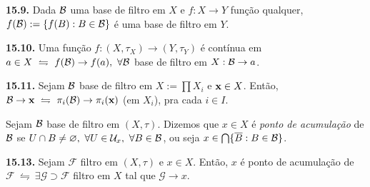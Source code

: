 
\begin{proposition}
    \textbf{15.9.} Dada \(\mathcal{B}\) uma base de filtro em \(X\) e \(f: X \to Y\) função qualquer, \(f(\mathcal{B}):= \{f(B) : B \in \mathcal{B}\}\) é uma base de filtro em \(Y\).  
\end{proposition}

\hypertarget{prop1510}{}
\begin{proposition}
    \textbf{15.10.} Uma função \(f : (X, \tau_X) \to (Y, \tau_Y)\) é contínua em \(a \in X \ \leftrightharpoons \ f(\B) \to f(a), \ \forall \B\) base de filtro em \(X : \mathcal{B} \to a\). 
\end{proposition}

\begin{proposition}
    \textbf{15.11.} Sejam \(\mathcal{B}\) base de filtro em \(X := \prod X_i\) e \(\textbf{x} \in X\). Então, \(\mathcal{B} \to \textbf{x} \ \leftrightharpoons \ \pi_i(\mathcal{B}) \to \pi_i(\textbf{x})\) (em \(X_i\)), pra cada \(i\in I\).
\end{proposition}


\begin{definition}
    Sejam \(\mathcal{B}\) base de filtro em \((X,\tau)\). Dizemos que \(x \in X\) é \emph{ponto de acumulação} de \(\mathcal{B}\) se \(U \cap B \neq \varnothing, \ \forall U \in \mathcal{U}_x, \ \forall B \in \mathcal{B}\), ou seja \(x \in \bigcap\{\overline{B}: B \in \mathcal{B}\}\). 
\end{definition}

\begin{proposition}
    \textbf{15.13.} Sejam \(\mathcal{F}\) filtro em \((X,\tau)\) e \(x \in X\). Então, \(x \) é ponto de acumulação de \(\mathcal{F} \ \leftrightharpoons \ \exists \mathcal{G}\supset \mathcal{F} \) filtro em \(X\) tal que \(\mathcal{G} \to x\).  
\end{proposition}

